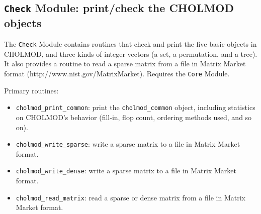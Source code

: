 \documentclass[11pt]{article}
\begin{document}
\newpage \subsection{{\tt Check} Module: print/check the CHOLMOD objects}
    The {\tt Check} Module contains routines that check and print the five
    basic objects in CHOLMOD, and three kinds of integer vectors (a set,
    a permutation, and a tree).  It also provides a routine to read a sparse
    matrix from a file in Matrix Market format (http://www.nist.gov/MatrixMarket).
    Requires the {\tt Core} Module.

\vspace{0.1in}
\noindent Primary routines:
    \begin{itemize}
    \item {\tt cholmod\_print\_common}: print the {\tt cholmod\_common} object,
	including statistics on CHOLMOD's behavior (fill-in, flop count,
	ordering methods used, and so on).
    \item {\tt cholmod\_write\_sparse}: write a sparse matrix to a file
	in Matrix Market format.
    \item {\tt cholmod\_write\_dense}: write a sparse matrix to a file
	in Matrix Market format.
    \item {\tt cholmod\_read\_matrix}: read a sparse or dense matrix from a file
	in Matrix Market format.
    \end{itemize}
\end{document}
